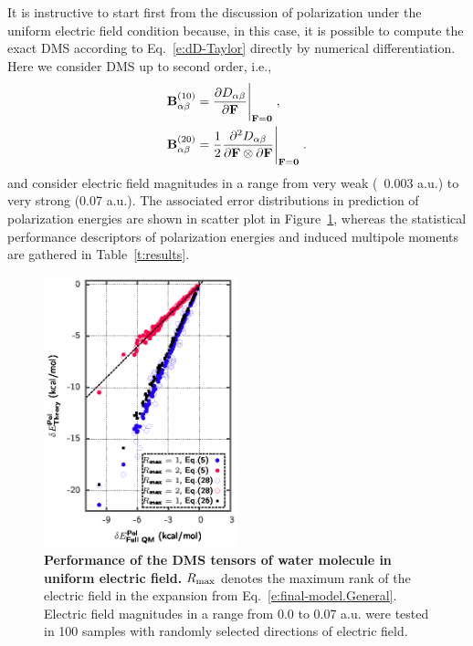 \documentclass[aip,amsmath,amssymb,reprint,floatfix]{revtex4-1}
\begin{document}
It is instructive to start first from the discussion of polarization under the uniform electric field
condition because, in this case, it is possible to compute the exact DMS according to Eq.~\eqref{e:dD-Taylor} 
directly by numerical differentiation. Here we consider DMS up to second order, i.e.,
%
\begin{subequations}\label{e:exact-DMS}
 \begin{align}
  {\bf B}^{(10)}_{\alpha\beta} &= \frac{\partial D_{\alpha\beta}}{\partial {\bf F}}\Bigg|_{{\bf F}={\bf 0}} \;, \label{e:B10} \\
  {\bf B}^{(20)}_{\alpha\beta} &= \frac{1}{2} 
     \frac{\partial^2 D_{\alpha\beta}}{\partial {\bf F} \otimes \partial {\bf F}}\Bigg|_{{\bf F}={\bf 0}} \;. \label{e:B20}
 \end{align}
\end{subequations}
%
and consider electric field magnitudes in a range from very weak (~0.003 a.u.) to very strong (0.07 a.u.).
The associated error distributions in prediction of polarization energies 
are shown in scatter plot in Figure~\ref{f:fig-1}, whereas the
statistical performance descriptors of polarization energies and induced multipole moments
are gathered in Table~\ref{t:results}.
%
\begin{figure}[h]
\includegraphics[width=0.5\textwidth]{data/dmatpol/water/figure1/fig-1.eps}
\caption{\label{f:fig-1} {\bf Performance of the DMS tensors of water molecule
in uniform electric field.} 
$R_{\rm max}$ denotes the maximum rank of the electric field
in the expansion from Eq.~\eqref{e:final-model.General}.
Electric field magnitudes in a range from 0.0 to 0.07 a.u. were tested in 100 samples with randomly selected 
directions of electric field.
} 
\end{figure}
%
\end{document}
